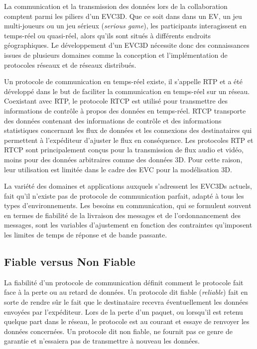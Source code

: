 La communication et la transmission des données lors de la collaboration comptent parmi les piliers d'un \gls{EVC3D}. Que ce soit dans dans un 
\gls{EV}, un jeu multi-joueurs ou un jeu sérieux (\textit{serious game}), les 
participants interagissent en temps-réel ou quasi-réel, alors qu'ils sont situés à 
différents endroits géographiques. 
Le développement d'un \gls{EVC3D} nécessite donc des connaissances issues de 
plusieurs domaines comme la conception et l'implémentation de protocoles 
réseaux et de réseaux distribués.

Un protocole de communication en temps-réel existe, il s'appelle \gls{RTP} et a 
été développé dans le but de faciliter la communication en temps-réel sur un 
réseau. Coexistant avec \gls{RTP}, le protocole \gls{RTCP} est utilisé pour 
transmettre des informations de contrôle à propos des données en temps-réel. 
\gls{RTCP} transporte des données contenant des informations de contrôle et des 
informations statistiques concernant les flux de données et les connexions des 
destinataires qui permettent à l'expéditeur d'ajuster le flux en conséquence. Les 
protocoles \gls{RTP} et \gls{RTCP} sont principalement conçus pour la 
transmission de flux audio et vidéo, moins pour des données arbitraires comme 
des données 3D. Pour cette raison, leur utilisation est limitée dans le cadre des 
\gls{EVC} pour la modélisation 3D. 

La variété des domaines et applications auxquels s'adressent les 
\glspl{EVC3D} actuels, fait qu'il n'existe pas de protocole de 
communication parfait, adapté à tous les types d'environnements. 
Les besoins en communication, qui se formulent souvent en termes de 
fiabilité de la livraison des messages et de l'ordonnancement des messages, sont 
les variables d'ajustement en fonction des contraintes qu'imposent les limites de 
temps de réponse et de bande passante.

\subsection{Fiable versus Non Fiable}
\label{sec:fiabilite}
La fiabilité d'un protocole de communication définit comment le protocole fait face 
à la perte ou au retard de données. Un protocole dit \og fiable\fg{} (\textit{reliable}) 
fait en sorte de rendre sûr le fait que le destinataire recevra éventuellement les 
données envoyées par l'expéditeur. Lors de la perte d'un paquet, ou lorsqu'il est 
retenu quelque part dans le réseau, le protocole est au courant et essaye de 
renvoyer les données concernées. Un protocole dit \og non fiable\fg{}, ne fournit 
pas ce genre de garantie et n'essaiera pas de transmettre à nouveau les données.

